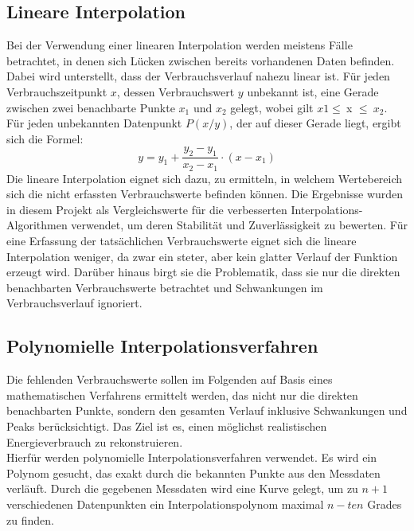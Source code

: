 \label{sec:easy_algorithms}


\subsection{Lineare Interpolation}

Bei der Verwendung einer linearen Interpolation werden meistens Fälle betrachtet, in denen sich Lücken zwischen bereits vorhandenen Daten befinden. Dabei wird unterstellt, dass der Verbrauchsverlauf nahezu linear ist. Für jeden Verbrauchszeitpunkt $x$, dessen Verbrauchswert $y$ unbekannt ist, eine Gerade zwischen zwei benachbarte Punkte $x_1$ und $x_2$ gelegt, wobei gilt $x1\leq\ $x $\leq \ x_2$. Für jeden unbekannten Datenpunkt $P(x/y)$, der auf dieser Gerade liegt, ergibt sich die Formel:
$$y = y_1 + \frac{y_2 - y_1}{x_2 - x_1} \cdot (x - x_1)$$
Die lineare Interpolation eignet sich dazu, zu ermitteln, in welchem Wertebereich sich die nicht erfassten Verbrauchswerte befinden können. Die Ergebnisse wurden in diesem Projekt als Vergleichswerte für die verbesserten Interpolations-Algorithmen verwendet, um deren Stabilität und Zuverlässigkeit zu bewerten. Für eine Erfassung der tatsächlichen Verbrauchswerte eignet sich die lineare Interpolation weniger, da zwar ein steter, aber kein glatter Verlauf der Funktion erzeugt wird. Darüber hinaus birgt sie die Problematik, dass sie nur die direkten benachbarten Verbrauchswerte betrachtet und Schwankungen im Verbrauchsverlauf ignoriert.

\subsection{Polynomielle Interpolationsverfahren}
Die fehlenden Verbrauchswerte sollen im Folgenden auf Basis eines mathematischen Verfahrens ermittelt werden, das nicht nur die direkten benachbarten Punkte, sondern den gesamten Verlauf inklusive Schwankungen und Peaks berücksichtigt. Das Ziel ist es, einen möglichst realistischen Energieverbrauch zu rekonstruieren.\\
Hierfür werden polynomielle Interpolationsverfahren verwendet. Es wird ein Polynom gesucht, das exakt durch die bekannten Punkte aus den Messdaten verläuft. Durch die gegebenen Messdaten wird eine Kurve gelegt, um zu $n+1$ verschiedenen Datenpunkten ein Interpolationspolynom maximal $n-ten$ Grades zu finden.

